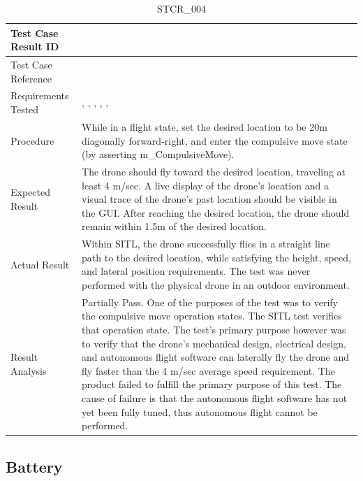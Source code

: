 \documentclass[12pt, titlepage]{article}
\begin{document}
\begin{table}[!h]
\begin{center}
\caption {STCR\_004}
\label{tab:STCR_004}
\begin{tabular}{ | m{3.2cm} | m{12.2cm} | } 
\hline
Test Case Result ID & \nameref{tab:STCR_004} \\ 
\hline
Test Case Reference & \nameref{tab:STC_004}  \\ 
\hline
Requirements Tested & \nameref{STA_002}, \nameref{TRANS_005}, \nameref{PERF_008}, \nameref{PERF_006}, \nameref{USE_001}, \nameref{PERF_003}
\\ 
\hline


\hline
Procedure & While in a flight state, set the desired location to be 20m diagonally forward-right, and enter the compulsive move state (by asserting m\_CompulsiveMove).    \\ 
\hline
Expected Result & The drone should fly toward the desired location, traveling at least 4 m/sec. A live display of the drone's location and a visual trace of the drone's past location should be visible in the GUI. After reaching the desired location, the drone should remain within 1.5m of the desired location.    \\ 
\hline
Actual Result & Within SITL, the drone successfully flies in a straight line path to the desired location, while satisfying the height, speed, and lateral position requirements. The test was never performed with the physical drone in an outdoor environment. \\ 
\hline
Result Analysis & Partially Pass. One of the purposes of the test was to verify the compulsive move operation states. The SITL test verifies that operation state. The test's primary purpose however was to verify that the drone's mechanical design, electrical design, and autonomous flight software can laterally fly the drone and fly faster than the 4 m/sec average speed requirement. The product failed to fulfill the primary purpose of this test. The cause of failure is that the autonomous flight software has not yet been fully tuned, thus autonomous flight cannot be performed. \\ 
\hline
\end{tabular}
\end{center}
\end{table}

\clearpage

\subsection{Battery}
\end{document}

